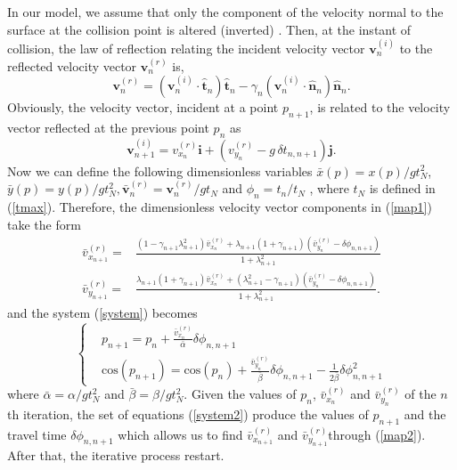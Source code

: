 \documentclass[reprint, aps, pre,nofootinbib]{revtex4-1}
\begin{document}
In our model, we assume that only the component of the velocity normal
to the surface at the collision point is altered (inverted) \citep{Barreiro1}.
Then, at the instant of collision, the law of reflection relating
the incident velocity vector $\boldsymbol{v}_{n}^{(i)}$ to the reflected
velocity vector $\boldsymbol{v}_{n}^{(r)}$ is,
\begin{equation}
\boldsymbol{v}_{n}^{(r)}=\left(\boldsymbol{v}_{n}^{(i)}\cdot\hat{\boldsymbol{t}}_{n}\right)\hat{\boldsymbol{t}}_{n}-\gamma_{n}\left(\boldsymbol{v}_{n}^{(i)}\cdot\hat{\boldsymbol{n}}_{n}\right)\hat{\boldsymbol{n}}_{n}.\label{map1}
\end{equation}
{\small{}Obviously, the velocity vector, incident at a point $p_{n+1}$,
is related to the velocity vector reflected at the previous point
$p_{n}$ as
\[
\boldsymbol{v}_{n+1}^{(i)}=v_{x_{n}}^{(r)}\boldsymbol{i}+\left(v_{y_{n}}^{(r)}-g\,\delta t_{n,n+1}\right)\boldsymbol{j}.
\]
Now we can define the following dimensionless variables $\bar{x}(p)=x(p)/gt_{N}^{2}$,
$\bar{y}(p)=y(p)/gt_{N}^{2},\bar{\boldsymbol{v}}_{n}^{(r)}=\boldsymbol{v}_{n}^{(r)}/gt_{N}$
and $\phi_{n}=t_{n}/t_{N}$ , where $t_{N}$ is defined in (\ref{tmax}).
Therefore, the dimensionless velocity vector components in (\ref{map1})
take the form
\begin{equation}
\begin{split}\bar{v}_{x_{n+1}}^{(r)}= & \frac{\left(1-\gamma_{n+1}\lambda_{n+1}^{2}\right)\bar{v}_{x_{n}}^{(r)}+\lambda_{n+1}\left(1+\gamma_{n+1}\right)\left(\bar{v}_{y_{n}}^{(r)}-\delta\phi_{n,n+1}\right)}{1+\lambda_{n+1}^{2}}\\
\bar{v}_{y_{n+1}}^{(r)}= & \frac{\lambda_{n+1}\left(1+\gamma_{n+1}\right)\bar{v}_{x_{n}}^{(r)}+\left(\lambda_{n+1}^{2}-\gamma_{n+1}\right)\left(\bar{v}_{y_{n}}^{(r)}-\delta\phi_{n,n+1}\right)}{1+\lambda_{n+1}^{2}}.
\end{split}
\label{map2}
\end{equation}
and the system (\ref{system})} becomes
\begin{equation}
\left\{ \begin{split} & p_{n+1}=p_{n}+\frac{\bar{v}_{x_{n}}^{(r)}}{\bar{\alpha}}\delta\phi_{n,n+1}\\
 & \textrm{cos}\left(p_{n+1}\right)=\textrm{cos}\left(p_{n}\right)+\frac{\bar{v}_{y_{n}}^{(r)}}{\bar{\beta}}\delta\phi_{n,n+1}-\frac{1}{2\bar{\beta}}\delta\phi_{n,n+1}^{2}
\end{split}
\right.\label{system2}
\end{equation}
where $\bar{\alpha}=\alpha/gt_{N}^{2}$ and $\bar{\beta}=\beta/gt_{N}^{2}$.
Given the values of $p_{n}$, $\bar{v}_{x_{n}}^{(r)}$ and $\bar{v}_{y_{n}}^{(r)}$
of the $n$th iteration, the set of equations (\ref{system2}) produce
the values of $p_{n+1}$ and the travel time $\delta\phi_{n,n+1}$
which allows us to find $\bar{v}_{x_{n+1}}^{(r)}$ and $\bar{v}_{y_{n+1}}^{(r)}$through
(\ref{map2}). After that, the iterative process restart. 
\end{document}
